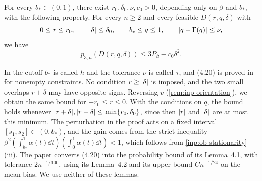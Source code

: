 \begin{proposition}\label{inp:ob-fixed-gap}
For every $b_*\in(0,1)$, there exist $r_0,\delta_0,\nu,c_0>0$, depending only on
$\beta$ and $b_*$, with the following property. For every $n\ge2$ and every
feasible $D(r,q,\delta)$ with
\[
 0\le r\le r_0,\qquad\lvert \delta\rvert\le\delta_0,\qquad b_*\le q\le1,\qquad
 \lvert q-\Gamma(q)\rvert\le\nu,
\]
we have
\[
 p_{3,n}(D(r,q,\delta))\le3P_\beta-c_0\delta^2.
\]
\end{proposition}

In \cite{oai-barriers} the cutoff $b_*$ is called $h$ and the tolerance $\nu$ is
called $\tau$, and (4.20) is proved in
\cite[Sections~4.2--4.4]{oai-barriers} for nonempty constraints. No condition
$r\ge\lvert \delta\rvert$ is imposed, and the two small overlaps $r\pm\delta$ may have
opposite signs. Reversing $v$ (\cref{rem:inp-orientation}), we obtain the same
bound for $-r_0\le r\le0$. With the conditions on $q$, the bound holds whenever
$\lvert r+\delta\rvert,\lvert r-\delta\rvert\le\min\{r_0,\delta_0\}$, since then $\lvert r\rvert$ and
$\lvert \delta\rvert$ are at most this minimum. The perturbation in the proof acts on a
fixed interval $[s_1,s_2]\subset(0,b_*)$, and the gain comes from the strict
inequality $\beta^2(\int_{b_*}^1\alpha(t)\dd t)(\int_0^1\alpha(t)\dd t)<1$,
which follows from \cref{inp:ob-stationarity}(iii). The paper \cite{oai-barriers} converts (4.20)
into the probability bound of its Lemma~4.1, with tolerance $2n^{-1/100}$, using
its Lemma~4.2 and its upper bound $Cn^{-1/24}$ on the mean bias. We use neither of these
lemmas.

